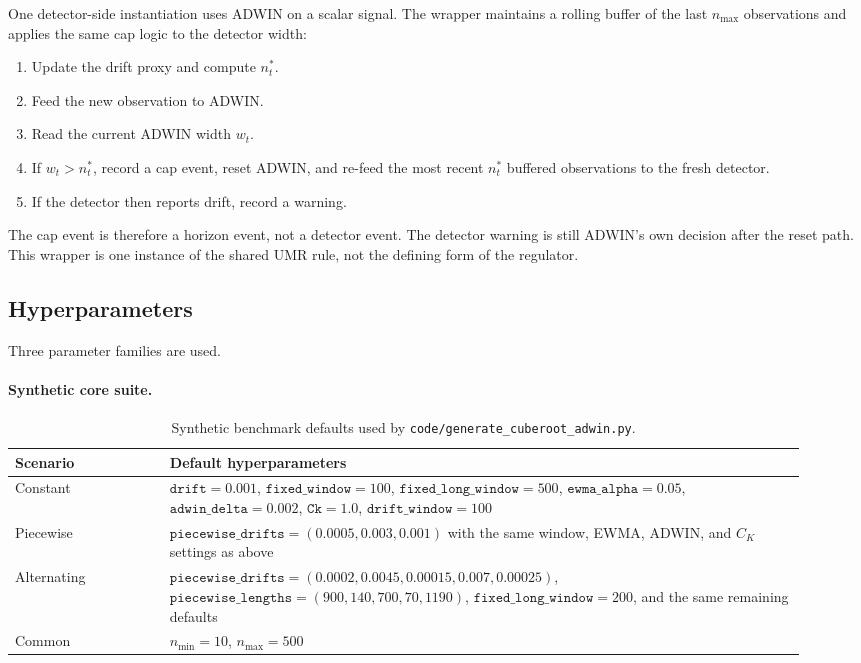 One detector-side instantiation uses ADWIN on a scalar signal. The wrapper
maintains a rolling buffer of the last $n_{\max}$ observations and applies the
same cap logic to the detector width:

\begin{enumerate}[leftmargin=1.5em]
  \item Update the drift proxy and compute $n_t^*$.
  \item Feed the new observation to ADWIN.
  \item Read the current ADWIN width $w_t$.
  \item If $w_t > n_t^*$, record a cap event, reset ADWIN, and re-feed the most
  recent $n_t^*$ buffered observations to the fresh detector.
  \item If the detector then reports drift, record a warning.
\end{enumerate}

The cap event is therefore a horizon event, not a detector event. The detector
warning is still ADWIN's own decision after the reset path. This wrapper is one
instance of the shared UMR rule, not the defining form of the regulator.

\subsection{Hyperparameters}

Three parameter families are used.

\paragraph{Synthetic core suite.}
\begin{table}[!htbp]
\centering
\small
\caption{Synthetic benchmark defaults used by \texttt{code/generate\_cuberoot\_adwin.py}.}
\label{tab:backend_umr_synth_defaults}
\begin{tabular}{p{0.18\linewidth}p{0.74\linewidth}}
\toprule
Scenario & Default hyperparameters \\
\midrule
Constant & $\texttt{drift}=0.001$, $\texttt{fixed\_window}=100$, $\texttt{fixed\_long\_window}=500$, $\texttt{ewma\_alpha}=0.05$, $\texttt{adwin\_delta}=0.002$, $\texttt{Ck}=1.0$, $\texttt{drift\_window}=100$ \\
Piecewise & $\texttt{piecewise\_drifts}=(0.0005,0.003,0.001)$ with the same window, EWMA, ADWIN, and $C_K$ settings as above \\
Alternating & $\texttt{piecewise\_drifts}=(0.0002,0.0045,0.00015,0.007,0.00025)$, $\texttt{piecewise\_lengths}=(900,140,700,70,1190)$, $\texttt{fixed\_long\_window}=200$, and the same remaining defaults \\
Common & $n_{\min}=10$, $n_{\max}=500$ \\
\bottomrule
\end{tabular}
\end{table}


